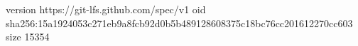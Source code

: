 version https://git-lfs.github.com/spec/v1
oid sha256:15a1924053c271eb9a8fcb92d0b5b489128608375c18bc76cc201612270cc603
size 15354
